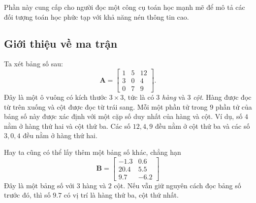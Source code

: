 Phần này cung cấp cho người đọc một công cụ toán học mạnh mẽ để mô tả các đối tượng toán học phức tạp với khả năng nén thông tin cao. 

\subsection{Giới thiệu về ma trận}
Ta xét bảng số sau:
\[ \mathbf{A}=
\begin{bmatrix}
    1&5&12\\
    3&0&4\\
    0&7&9
\end{bmatrix}.
\]
Đây là một ô vuông có kích thước \(3\times 3\), tức là có \(3\) \emph{hàng} và \(3\) \emph{cột}. Hàng được đọc từ trên xuống và cột được đọc từ trái sang. Mỗi một phần tử  trong \(9\) phần tử  của bảng số này được xác định với một cặp số duy nhất của hàng và cột. Ví dụ, số \(4\) nằm ở hàng thứ hai và cột thứ ba. 
Các số \(12,4,9\) đều nằm ở cột thứ ba và các số \(3,0,4\) đều nằm ở hàng thứ hai. 

Hay ta cũng có thể lấy thêm một bảng số khác, chẳng hạn
\[\mathbf{B}=\begin{bmatrix}
    -1.3&0.6\\
    20.4&5.5\\
    9.7&-6.2
\end{bmatrix}\] Đây là một bảng số với \(3\) hàng và \(2\) cột. Nếu vẫn giữ nguyên cách đọc bảng số trước đó, thì số \(9.7\) có vị trí là hàng thứ ba, cột thứ nhất. 


